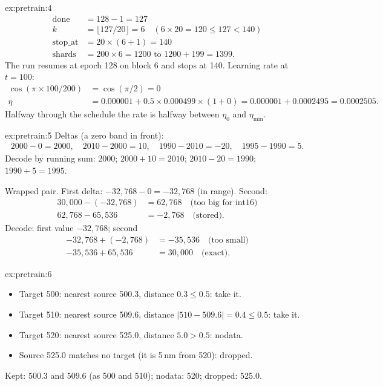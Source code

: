 \begin{solution}{ex:pretrain:4}
\begin{align*}
  \text{done} &= 128 - 1 = 127\\
  k &= \lfloor 127 / 20 \rfloor = 6 \quad (6 \times 20 = 120 \le 127 < 140)\\
  \text{stop\_at} &= 20 \times (6 + 1) = 140\\
  \text{shards} &= 200 \times 6 = 1200 \text{ to } 1200 + 199 = 1399.
\end{align*}
The run resumes at epoch 128 on block 6 and stops at 140. Learning rate at $t = 100$:
\begin{align*}
  \cos(\pi \times 100 / 200) &= \cos(\pi/2) = 0\\
  \eta &= 0.000001 + 0.5 \times 0.000499 \times (1 + 0) = 0.000001 + 0.0002495 = 0.0002505.
\end{align*}
Halfway through the schedule the rate is halfway between $\eta_0$ and $\eta_{\min}$.
\end{solution}

\begin{solution}{ex:pretrain:5}
Deltas (a zero band in front):
\begin{align*}
  2000 - 0 = 2000,\quad 2010 - 2000 = 10,\quad 1990 - 2010 = -20,\quad 1995 - 1990 = 5.
\end{align*}
Decode by running sum: $2000$; $2000 + 10 = 2010$; $2010 - 20 = 1990$; $1990 + 5 = 1995$.

Wrapped pair. First delta: $-32{,}768 - 0 = -32{,}768$ (in range). Second:
\begin{align*}
  30{,}000 - (-32{,}768) &= 62{,}768 \quad\text{(too big for int16)}\\
  62{,}768 - 65{,}536 &= -2{,}768 \quad\text{(stored)}.
\end{align*}
Decode: first value $-32{,}768$; second
\begin{align*}
  -32{,}768 + (-2{,}768) &= -35{,}536 \quad\text{(too small)}\\
  -35{,}536 + 65{,}536 &= 30{,}000 \quad\text{(exact).}
\end{align*}
\end{solution}

\begin{solution}{ex:pretrain:6}
\begin{itemize}
  \item Target 500: nearest source 500.3, distance $0.3 \le 0.5$: take it.
  \item Target 510: nearest source 509.6, distance $|510 - 509.6| = 0.4 \le 0.5$: take it.
  \item Target 520: nearest source 525.0, distance $5.0 > 0.5$: nodata.
  \item Source 525.0 matches no target (it is 5\,nm from 520): dropped.
\end{itemize}
Kept: 500.3 and 509.6 (as 500 and 510); nodata: 520; dropped: 525.0.
\end{solution}
